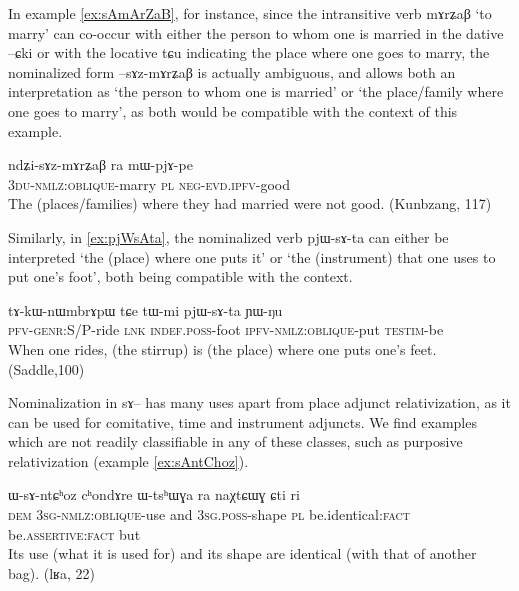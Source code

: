 \documentclass[oldfontcommands,oneside,a4paper,11pt]{article}
\newcommand{\ipa}[1]{{\phon #1}} %
\begin{document}
In example \ref{ex:sAmArZaB}, for instance, since the intransitive verb \ipa{mɤrʑaβ} `to marry' can co-occur with either the person to whom one is married in the dative \ipa{--ɕki} or with the locative \ipa{tɕu} indicating the place where one goes to marry, the nominalized form \ipa{--sɤz-mɤrʑaβ} is actually ambiguous, and allows both an interpretation as `the person to whom one is married' or `the place/family where one goes to marry', as both would be compatible with the context of this example.



\begin{exe}
   \ex \label{ex:sAmArZaB}
 \gll
	\ipa{ndʑi-sɤz-mɤrʑaβ}   	\ipa{ra}   	\ipa{mɯ-pjɤ-pe}   \\
\textsc{3du-nmlz:oblique}-marry \textsc{pl} \textsc{neg-evd.ipfv}-good \\
\glt The (places/families) where they had married were not good. (Kunbzang, 117)
\end{exe}


Similarly, in  \ref{ex:pjWsAta}, the nominalized verb 	\ipa{pjɯ-sɤ-ta}  can either be interpreted `the (place) where one puts it' or `the (instrument) that one uses to put one's foot', both being compatible with the context.

\begin{exe}
   \ex \label{ex:pjWsAta}
 \gll
\ipa{tɤ-kɯ-nɯmbrɤpɯ}   	\ipa{tɕe}   	\ipa{tɯ-mi}   	\ipa{pjɯ-sɤ-ta}   	\ipa{ɲɯ-ŋu}   \\
\textsc{pfv-genr:S/P}-ride \textsc{lnk}  \textsc{indef.poss}-foot \textsc{ipfv-nmlz:oblique}-put \textsc{testim}-be \\
\glt When one rides, (the stirrup) is (the place) where one puts one's feet. (Saddle,100)
\end{exe}


Nominalization in \ipa{sɤ}-- has many uses apart from place adjunct relativization, as it can be used for comitative, time and instrument adjuncts. We find examples which are not readily classifiable in any of these classes, such as purposive relativization (example \ref{ex:sAntChoz}).  

     \begin{exe}
  \ex   \label{ex:sAntChoz}  
\gll \ipa{nɯnɯ}  	\ipa{ɯ-sɤ-ntɕʰoz}  	\ipa{cʰondɤre}  	\ipa{ɯ-tsʰɯɣa}  	\ipa{ra}  	\ipa{naχtɕɯɣ}  	\ipa{ɕti}  	\ipa{ri}  	\\
\textsc{dem} \textsc{3sg-nmlz:oblique}-use and \textsc{3sg.poss}-shape \textsc{pl} be.identical:\textsc{fact} be.\textsc{assertive}:\textsc{fact} but \\
\glt  Its use (what it is used for) and its shape are identical (with that of another bag). (lʁa, 22)
   \end{exe} 
\end{document}
